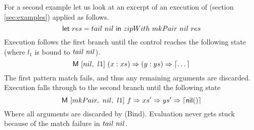 
For a second example let us look at an excerpt of an execution of  (section \ref{sec:examples}) applied as follows.
\[
  \textsf{let}~res = tail~nil~\textsf{in}~zipWith~mkPair~nil~res
\]
Execution follows the first branch until the control reaches the following state (where $l_1$ is bound to $tail~nil$).
\[
    \textsf{M}~[nil,~l1]~(x : xs) \Rightarrow (y : ys) \Rightarrow \left\lceil \dots\right\rceil  \\
\]
The first pattern match fails, and thus any remaining arguments are discarded.
Execution falls through to the second branch until the following state
\[
  \textsf{M}~[mkPair,~nil,~l1]~f \Rightarrow xs' \Rightarrow ys' \Rightarrow \left\lceil \textsf{nil}(\right)\rceil
\]
Where all arguments are discarded by \smallrule(Bind).
Evaluation never gets stuck because of the match failure in $tail~nil$.


